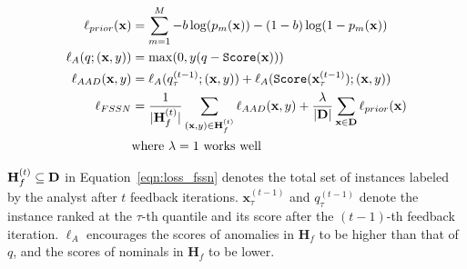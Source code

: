 \documentclass{article}
\begin{document}
\begin{align}
\ell_{prior}({\bf x}) &= \sum_{m=1}^M{-b\log(p_m({\bf x})) -(1 - b)\log(1 - p_m({\bf x}))} \label{eqn:prior} \\
\ell_A(q; ({\bf x}, y)) &= \max(0, y (q - \text{\texttt{Score}$({\bf x})$})) \label{eqn:la_loss} \\
\ell_{AAD}({\bf x}, y) &= \ell_A(q_{\tau}^{(t-1)}; ({\bf x}, y)) + \ell_A(\text{\texttt{Score}}({\bf x}_{\tau}^{(t-1)}); ({\bf x}, y)) \label{eqn:aad_loss} \\
\ell_{FSSN} &= \frac{1}{|{\bf H}_f^{(t)}|} \sum_{({\bf x}, y) \in {\bf H}_f^{(t)}} \ell_{AAD}({\bf x}, y) + \frac{\lambda}{|{\bf D}|} \sum_{{\bf x} \in {\bf D}}\ell_{prior}({\bf x}) \label{eqn:loss_fssn} \\
& \text{where $\lambda=1$ works well} \nonumber
\end{align}

$\mathbf{H}_f^{(t)} \subseteq {\bf D}$ in Equation~\ref{eqn:loss_fssn} denotes the total set of instances labeled by the analyst after $t$ feedback iterations. ${\mathbf x}_{\tau}^{(t-1)}$ and $q_{\tau}^{(t-1)}$ denote the instance ranked at the $\tau$-th quantile and its score after the $(t-1)$-th feedback iteration. $\ell_{A}$ encourages the scores of anomalies in $\mathbf{H}_f$ to be higher than that of $q$, and the scores of nominals in $\mathbf{H}_f$ to be lower.
\end{document}

